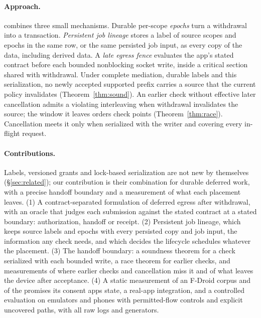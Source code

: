 \paragraph{Approach.} \sys combines three small mechanisms. Durable per-scope \emph{epochs} turn a withdrawal into a
transaction. \emph{Persistent job lineage} stores a label of source scopes and epochs in the same row, or the same
persisted job input, as every copy of the data, including derived data. A \emph{late egress fence} evaluates the app's stated
contract before each bounded nonblocking socket write, inside a critical section shared with withdrawal. Under complete
mediation, durable labels and this serialization, no newly accepted supported prefix carries a source that the current policy invalidates (Theorem~\ref{thm:sound}). An earlier check without effective later cancellation admits a violating interleaving when withdrawal invalidates the source; the
window it leaves orders check points (Theorem~\ref{thm:race}). Cancellation meets it only when serialized with the
writer and covering every in-flight request.



\paragraph{Contributions.}
Labels, versioned grants and lock-based serialization are not new by themselves (\S\ref{sec:related}); our contribution is
their combination for durable deferred work, with a precise handoff boundary and a measurement of what each placement
leaves. (1) A contract-separated formulation of deferred egress after withdrawal, with an oracle that judges each
submission against the stated contract at a stated boundary: authorization, handoff or receipt. (2) Persistent job
lineage, which keeps source labels and epochs with every persisted copy and job input, the information any check needs,
and which decides the lifecycle schedules whatever the placement. (3) The handoff boundary: a soundness theorem for a
check serialized with each bounded write, a race theorem for earlier checks, and measurements of where earlier checks and
cancellation miss it and of what leaves the device after acceptance. (4) A static measurement of an F-Droid corpus and of
the promises its consent apps state, a real-app integration, and a controlled evaluation on emulators and phones with
permitted-flow controls and explicit uncovered paths, with all raw logs and generators.
